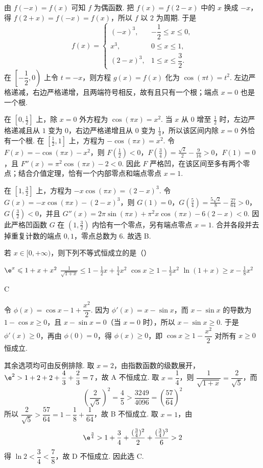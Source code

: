 \begin{solution}
由 \(f(-x)=f(x)\) 可知 \(f\) 为偶函数. 把 \(f(x)=f(2-x)\) 中的 \(x\) 换成 \(-x\)，得 \(f(2+x)=f(-x)=f(x)\)，所以 \(f\) 以 \(2\) 为周期. 于是
\[
f(x)=
\begin{cases}
(-x)^3,&-\dfrac12\leqslant x\leqslant0,\\
x^3,&0\leqslant x\leqslant1,\\
(2-x)^3,&1\leqslant x\leqslant\dfrac32.
\end{cases}
\]
在 \(\left[-\dfrac12,0\right)\) 上令 \(t=-x\)，则方程 \(g(x)=f(x)\) 化为 \(\cos(\pi t)=t^2\). 左边严格递减，右边严格递增，且两端符号相反，故有且只有一个根；端点 \(x=0\) 也是一个根.

在 \([0,\frac12]\) 上，除 \(x=0\) 外方程为 \(\cos(\pi x)=x^2\). 当 \(x\) 从 \(0\) 增至 \(\frac12\) 时，左边严格递减且从 \(1\) 变为 \(0\)，右边严格递增且从 \(0\) 变为 \(\frac14\)，所以该区间内除 \(x=0\) 外恰有一个根. 在 \([\frac12,1]\) 上，方程为 \(-\cos(\pi x)=x^2\). 令 \(F(x)=-\cos(\pi x)-x^2\)，则 \(F(\frac12)<0\)，\(F(\frac34)=\frac{\sqrt2}{2}-\frac9{16}>0\)，\(F(1)=0\)，且 \(F''(x)=\pi^2\cos(\pi x)-2<0\). 因此 \(F\) 严格凹，在该区间至多有两个零点；结合介值定理，恰有一个内部零点和端点零点 \(x=1\).

在 \([1,\frac32]\) 上，方程为 \(-x\cos(\pi x)=(2-x)^3\). 令 \(G(x)=-x\cos(\pi x)-(2-x)^3\)，则 \(G(1)=0\)，\(G(\frac54)=\frac{5\sqrt2}{8}-\frac{27}{64}>0\)，\(G(\frac32)<0\)，并且 \(G''(x)=2\pi\sin(\pi x)+\pi^2x\cos(\pi x)-6(2-x)<0\). 因此严格凹函数 \(G\) 在 \((1,\frac32)\) 内恰有一个零点，另有端点零点 \(x=1\). 合并各段并去掉重复计数的端点 \(0,1\)，零点总数为 \(6\). 故选 B.
\end{solution}

\begin{problem}
若 \(x \in [0, +\infty)\)，则下列不等式恒成立的是（\quad）

\choices
    {\( \e^{x}\leqslant1+x+x^{2} \)}
    {\(\frac{1}{\sqrt{1 + x}}\leqslant 1 - \frac{1}{2} x + \frac{1}{4} x^2\)}
    {\(\cos x \geqslant 1 - \frac{1}{2} x^2\)}
    {\(\ln (1 + x) \geqslant x - \frac{1}{8} x^2\)}
\end{problem}

\begin{answer}
C
\end{answer}

\begin{solution}
令 \(\phi(x)=\cos x-1+\dfrac{x^2}{2}\). 因为 \(\phi'(x)=x-\sin x\)，而 \(x-\sin x\) 的导数为 \(1-\cos x\geqslant0\)，且 \(x-\sin x=0\)（当 \(x=0\) 时），所以 \(x-\sin x\geqslant0\). 于是 \(\phi'(x)\geqslant0\)，再由 \(\phi(0)=0\)，得 \(\phi(x)\geqslant0\)，即 \(\cos x\geqslant1-\dfrac{x^2}{2}\) 对所有 \(x\geqslant0\) 恒成立.

其余选项均可由反例排除. 取 \(x=2\)，由指数函数的级数展开，\(\e^2>1+2+2+\dfrac43+\dfrac23=7\)，故 A 不恒成立. 取 \(x=\dfrac14\)，则 \(\dfrac1{\sqrt{1+x}}=\dfrac2{\sqrt5}\)，而
\[
\left(\frac2{\sqrt5}\right)^2=\frac45>\frac{3249}{4096}=\left(\frac{57}{64}\right)^2
\]
所以 \(\dfrac2{\sqrt5}>\dfrac{57}{64}=1-\dfrac18+\dfrac1{64}\)，故 B 不恒成立. 取 \(x=1\)，由
\[
\e^{\frac{3}{4}}>1+\frac34+\frac{(\frac{3}{4})^2}{2}+\frac{(\frac{3}{4})^3}{6}>2
\]
得 \(\ln2<\dfrac34<\dfrac78\)，故 D 不恒成立. 因此选 C.
\end{solution}

